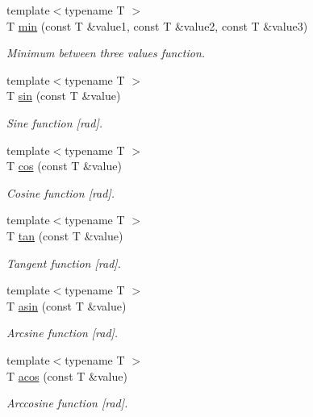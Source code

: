 \begin{DoxyCompactItemize}
{\footnotesize template$<$typename T $>$ }\\T \hyperlink{namespaceacme_a49c47fe19dcb5a41cdb8111446c6f51e}{min} (const T \&value1, const T \&value2, const T \&value3)
\begin{DoxyCompactList}\small\item\em Minimum between three values function. \end{DoxyCompactList}\item 
{\footnotesize template$<$typename T $>$ }\\T \hyperlink{namespaceacme_a47c0b8f84e101492adfb8567e85214d9}{sin} (const T \&value)
\begin{DoxyCompactList}\small\item\em Sine function \mbox{[}rad\mbox{]}. \end{DoxyCompactList}\item 
{\footnotesize template$<$typename T $>$ }\\T \hyperlink{namespaceacme_ae74481d6a235be6f194a86ade7719e5c}{cos} (const T \&value)
\begin{DoxyCompactList}\small\item\em Cosine function \mbox{[}rad\mbox{]}. \end{DoxyCompactList}\item 
{\footnotesize template$<$typename T $>$ }\\T \hyperlink{namespaceacme_a0fa0c6c9aef80a18fe865938fa2cb01d}{tan} (const T \&value)
\begin{DoxyCompactList}\small\item\em Tangent function \mbox{[}rad\mbox{]}. \end{DoxyCompactList}\item 
{\footnotesize template$<$typename T $>$ }\\T \hyperlink{namespaceacme_a8c712ed5d1336fab688be5cd7c6afd07}{asin} (const T \&value)
\begin{DoxyCompactList}\small\item\em Arcsine function \mbox{[}rad\mbox{]}. \end{DoxyCompactList}\item 
{\footnotesize template$<$typename T $>$ }\\T \hyperlink{namespaceacme_a9ea04b104383cbb01ba4b6bc8fbd1823}{acos} (const T \&value)
\begin{DoxyCompactList}\small\item\em Arccosine function \mbox{[}rad\mbox{]}. \end{DoxyCompactList}\item 

\end{DoxyCompactItemize}
